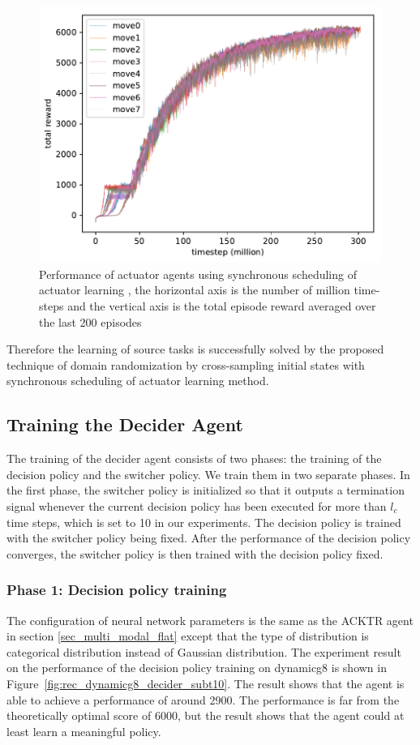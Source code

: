 \begin{figure}[!htbp]
	\includegraphics[width=\textwidth]{images/rec_180619_sync.pdf}
	\centering
	\caption{Performance of actuator agents using synchronous scheduling of actuator learning , the horizontal axis is the number of million time-steps and the vertical axis is the total episode reward averaged over the last 200 episodes}\label{rec_sync_training}
\end{figure}

Therefore the learning of source tasks is successfully solved by the proposed technique of domain randomization by cross-sampling initial states with synchronous scheduling of actuator learning method.
\subsection{Training the Decider Agent}
The training of the decider agent consists of two phases: the training of the decision policy and the switcher policy. We train them in two separate phases. In the first phase, the switcher policy is initialized so that it outputs a termination signal whenever the current decision policy has been executed for more than $l_c$ time steps, which is set to 10 in our experiments. The decision policy is trained with the switcher policy being fixed. After the performance of the decision policy converges, the switcher policy is then trained with the decision policy fixed.

\subsubsection{Phase 1: Decision policy training}
The configuration of neural network parameters is the same as the ACKTR agent in section \ref{sec_multi_modal_flat} except that the type of distribution is categorical distribution instead of Gaussian distribution.
The experiment result on the performance of the decision policy training on dynamicg8 is shown in Figure~\ref{fig:rec_dynamicg8_decider_subt10}. The result shows that the agent is able to achieve a performance of around 2900. The performance is far from the theoretically optimal score of 6000, but the result shows that the agent could at least learn a meaningful policy.

